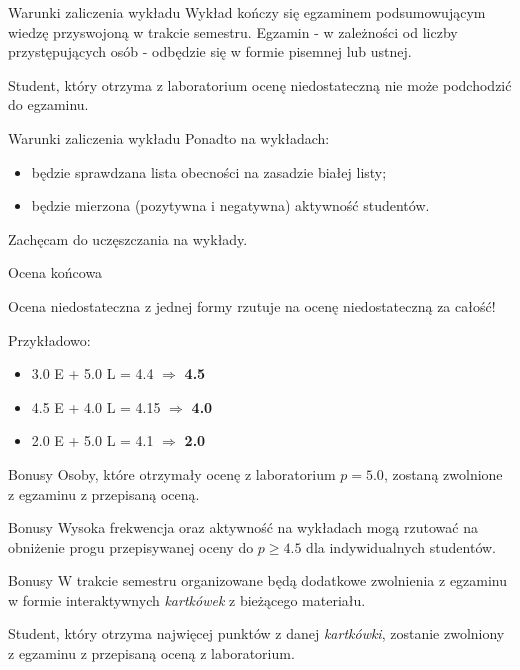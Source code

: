 \begin{frame}{Warunki zaliczenia wykładu}
	Wykład kończy się egzaminem podsumowującym wiedzę przyswojoną w trakcie semestru. Egzamin - w zależności od liczby przystępujących osób - odbędzie się w formie pisemnej lub ustnej.
	
	Student, który otrzyma z laboratorium ocenę niedostateczną nie może podchodzić do egzaminu.
\end{frame}

\begin{frame}{Warunki zaliczenia wykładu}	
	Ponadto na wykładach:
	\begin{itemize}
		\item będzie sprawdzana lista obecności na zasadzie białej listy;
		\item będzie mierzona (pozytywna i negatywna) aktywność studentów.
	\end{itemize}
	
	Zachęcam do uczęszczania na wykłady.
\end{frame}

\begin{frame}{Ocena końcowa}
	\begin{figure}
	\end{figure}
	
	Ocena niedostateczna z jednej formy rzutuje na ocenę niedostateczną za całość!
	
	Przykładowo:
	\begin{itemize}
		\item 3.0 E + 5.0 L = 4.4 $\Rightarrow$ \textbf{4.5}
		\item 4.5 E + 4.0 L = 4.15 $\Rightarrow$ \textbf{4.0}
		\item 2.0 E + 5.0 L = 4.1 $\Rightarrow$ \textbf{2.0}
	\end{itemize}
\end{frame}

\begin{frame}{Bonusy}	
	Osoby, które otrzymały ocenę z laboratorium \textbf{$p = 5.0$}, zostaną zwolnione z egzaminu z przepisaną oceną.
\end{frame}

\begin{frame}{Bonusy}	
	Wysoka frekwencja oraz aktywność na wykładach mogą rzutować na obniżenie progu przepisywanej oceny do $p \geq 4.5$ dla indywidualnych studentów.
\end{frame}

\begin{frame}{Bonusy}		
	W trakcie semestru organizowane będą dodatkowe zwolnienia z egzaminu w formie interaktywnych \emph{kartkówek} z bieżącego materiału.
	
	Student, który otrzyma najwięcej punktów z danej \emph{kartkówki}, zostanie zwolniony z egzaminu z przepisaną oceną z laboratorium.
\end{frame}

